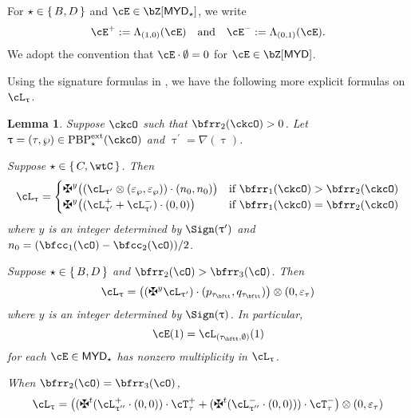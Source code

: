 \documentclass[12pt,a4paper]{amsart}
\def\MYD{{\mathsf{MYD}}}
\def\DD{\nabla}
\numberwithin{equation}{section}
\newtheorem{lem}[thm]{Lemma}
\theoremstyle{remark}
\def\PBPes{\mathrm{PBP}^{\mathrm{ext}}_{\star}}
\def\uptaup{\uptau^{\prime}}
\def\uptaupp{\uptau^{\prime\prime}}
\begin{document}
For $\star\in \set{B,D}$ and $\cE\in \bZ[\MYD_{\star}]$, we write
\[
\cE^{+} := \Lambda_{(1,0)}(\cE) \AND \cE^{-} := \Lambda_{(0,1)}(\cE).
\]
We adopt the convention that $\cE\cdot \emptyset = 0$ for $\cE\in\bZ[\MYD]$.

Using the signature formulas in , we have the following more
explicit formulas on $\ac_{\uptau}$.
\begin{lem}\label{lem:dlift}
  Suppose $\ckcO$ such that $\bfrr_{2}(\ckcO)>0$. Let
  $\uptau = (\tau,\wp)\in \PBPes(\ckcO)$ and $\uptaup = \DD(\uptau)$.
\begin{enuma}
  \item
  Suppose $\star\in \set{C,\wtC}$.  Then
  \begin{equation}\label{eq:C}
    \ac_{\uptau}=
    \begin{cases}
      \maltese^{y}\big( (\ac_{\uptau'}\lotimes (\varepsilon_{\wp},\varepsilon_{\wp}))
      \cdot (n_{0},n_{0})\big) & \text{if } \bfrr_{1}(\ckcO)>\bfrr_{2}(\ckcO)\\
      \maltese^{y}\big( (\pac{\uptau'} + \nac{\uptaup})\cdot (0,0) \big)
      & \text{if } \bfrr_{1}(\ckcO)=\bfrr_{2}(\ckcO)
    \end{cases}
  \end{equation}
  where $y$ is an integer determined by $\Sign(\uptaup)$ and $n_{0} = (\bfcc_{1}(\cO)-\bfcc_{2}(\cO))/2$.
  \item
  Suppose $\star\in \set{B,D}$ and $\bfrr_{2}(\cO)>\bfrr_{3}(\cO)$. Then
  \begin{equation}\label{eq:BD}
    \ac_{\uptau}= \big((\maltese^{y}\ac_{\uptau'})\cdot (p_{\tau_{\bftt}},q_{\tau_{\bftt}})\big)
    \lotimes (0,\varepsilon_{\tau})
  \end{equation}
  where $y$ is an integer determined by $\Sign(\uptau)$.
  In particular,
  \begin{equation}\label{eq:TBD}
    \cE(1) = \ac_{(\tau_{\bftt},\emptyset)}(1)
  \end{equation}
  for each $\cE\in \MYD_\star$ has nonzero multiplicity in $\ac_{\uptau}$.
  \item
  When  $\bfrr_{2}(\cO)=\bfrr_{3}(\cO)$,
  \begin{equation}\label{eq:BD2}
    \ac_{\uptau} =
    \big((\maltese^t (\pac{\uptaupp}\cdot (0,0)) \cdot \pcT_{\tau}
    +  (\maltese^t(\nac{\uptaupp}\cdot (0,0)) ) \cdot \ncT_{\tau}\big)\lotimes(0,\varepsilon_{\tau})

\end{equation}
\end{enuma}
\end{lem}
\end{document}
